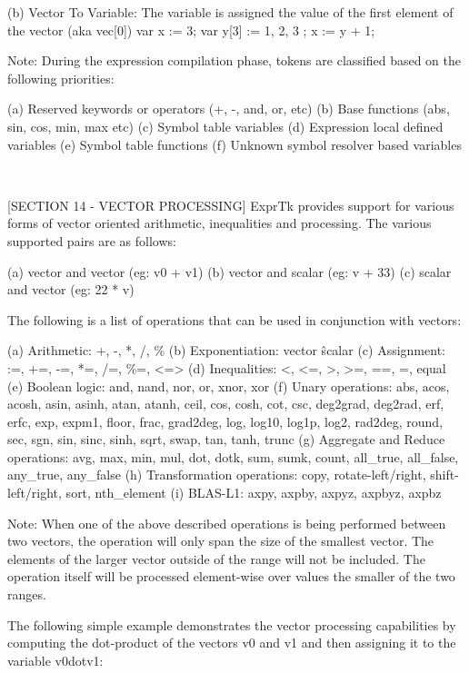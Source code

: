 (b) Vector To Variable:
The variable is assigned the value of the first element of the
vector (aka vec[0])
var x    := 3;
var y[3] := { 1, 2, 3 };
x := y + 1;


Note: During the expression  compilation phase, tokens are  classified
based on the following priorities:

(a) Reserved keywords or operators (+, -, and, or, etc)
(b) Base functions (abs, sin, cos, min, max etc)
(c) Symbol table variables
(d) Expression local defined variables
(e) Symbol table functions
(f) Unknown symbol resolver based variables

~~~~~~~~~~~~~~~~~~~~~~~~~~~~~~~~~~~~~~~~~~~~~~~~~~~~~~~~~~

[SECTION 14 - VECTOR PROCESSING]
ExprTk  provides  support  for   various  forms  of  vector   oriented
arithmetic, inequalities and  processing. The various  supported pairs
are as follows:

(a) vector and vector (eg: v0 + v1)
(b) vector and scalar (eg: v  + 33)
(c) scalar and vector (eg: 22 *  v)

The following is a list of operations that can be used in  conjunction
with vectors:

(a) Arithmetic:       +, -, *, /, \%
(b) Exponentiation:   vector \^ scalar
(c) Assignment:       :=, +=, -=, *=, /=, \%=, <=>
(d) Inequalities:     <, <=, >, >=, ==, =, equal
(e) Boolean logic:    and, nand, nor, or, xnor, xor
(f) Unary operations:
abs, acos, acosh, asin, asinh, atan, atanh, ceil, cos,  cosh,
cot, csc,  deg2grad, deg2rad,  erf, erfc,  exp, expm1, floor,
frac, grad2deg, log, log10, log1p, log2, rad2deg, round, sec,
sgn, sin, sinc, sinh, sqrt, swap, tan, tanh, trunc
(g) Aggregate and Reduce operations:
avg, max, min, mul,  dot, dotk, sum, sumk,  count, all\_true,
all\_false, any\_true, any\_false
(h) Transformation operations:
copy, rotate-left/right, shift-left/right, sort, nth\_element
(i) BLAS-L1:
axpy, axpby, axpyz, axpbyz, axpbz

Note: When one of  the above  described operations  is being performed
between two  vectors, the  operation will  only span  the size  of the
smallest vector.  The elements  of the  larger vector  outside of  the
range will  not be included. The  operation  itself will  be processed
element-wise over values the smaller of the two ranges.

The  following  simple  example  demonstrates  the  vector  processing
capabilities by computing the dot-product of the vectors v0 and v1 and
then assigning it to the variable v0dotv1:


